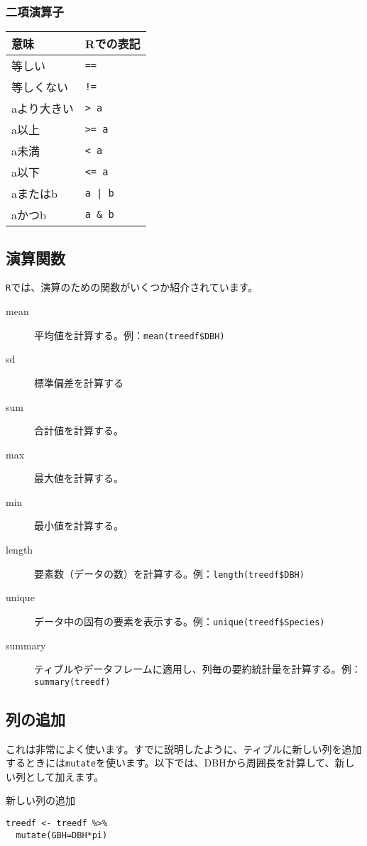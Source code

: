     \subsubsection{二項演算子}
\begin{table}[htb]
 \begin{center}
  \begin{tabular}{ll} \toprule
意味 & Rでの表記  \\ \midrule
等しい & \verb|==|  \\
等しくない & \verb|!=| \\
aより大きい & \verb|> a| \\
a以上 & \verb|>= a| \\
a未満 & \verb|< a| \\
a以下 & \verb|<= a| \\
aまたはb & \verb~a | b ~ \\
aかつb & \verb|a & b| \\ \bottomrule
  \end{tabular}
 \end{center}
\end{table}

  \subsection{演算関数}
\texttt{R}では、演算のための関数がいくつか紹介されています。
\begin{description}
  \item[mean]平均値を計算する。例：\verb|mean(treedf$DBH)|
  \item[sd]標準偏差を計算する
  \item[sum]合計値を計算する。
  \item[max]最大値を計算する。
  \item[min]最小値を計算する。
  \item[length]要素数（データの数）を計算する。例：\verb|length(treedf$DBH)|
  \item[unique]データ中の固有の要素を表示する。例：\verb|unique(treedf$Species)|
  \item[summary]ティブルやデータフレームに適用し、列毎の要約統計量を計算する。例：\verb|summary(treedf)|
\end{description}

  \subsection{列の追加}
これは非常によく使います。すでに説明したように、ティブルに新しい列を追加するときには\verb|mutate|を使います。以下では、DBHから周囲長を計算して、新しい列として加えます。
\begin{itembox}[l]{新しい列の追加}
\begin{verbatim}
treedf <- treedf %>%
  mutate(GBH=DBH*pi)
\end{verbatim}
\end{itembox}

